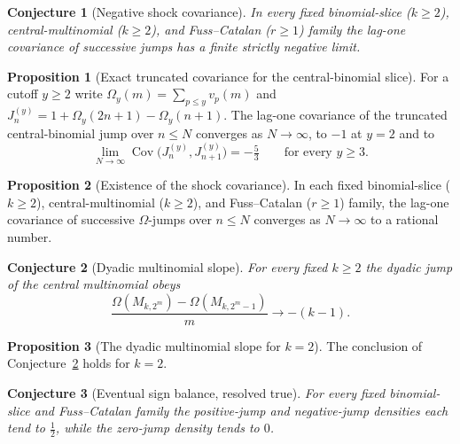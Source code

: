 \documentclass[11pt]{article}
\newtheorem{conjecture}{Conjecture}
\theoremstyle{definition}
\newtheorem{proposition}{Proposition}
\begin{document}
\begin{conjecture}[Negative shock covariance]\label{w17}
In every fixed binomial-slice ($k\ge2$), central-multinomial ($k\ge2$), and Fuss--Catalan ($r\ge1$) family the lag-one covariance of successive jumps has a finite strictly negative limit.
\end{conjecture}

\begin{proposition}[Exact truncated covariance for the central-binomial slice]\label{w:cov53}
For a cutoff $y\ge2$ write $\Omega_y(m)=\sum_{p\le y}v_p(m)$ and $J^{(y)}_n=1+\Omega_y(2n+1)-\Omega_y(n+1)$.  The lag-one covariance of the truncated central-binomial jump over $n\le N$ converges as $N\to\infty$, to $-1$ at $y=2$ and to
\[
\lim_{N\to\infty}\operatorname{Cov}\bigl(J^{(y)}_n,J^{(y)}_{n+1}\bigr)=-\tfrac53\qquad\text{for every }y\ge3.
\]
\end{proposition}

\begin{proposition}[Existence of the shock covariance]\label{w:covexist}
In each fixed binomial-slice ($k\ge2$), central-multinomial ($k\ge2$), and Fuss--Catalan ($r\ge1$) family, the lag-one covariance of successive $\Omega$-jumps over $n\le N$ converges as $N\to\infty$ to a rational number.
\end{proposition}

\begin{conjecture}[Dyadic multinomial slope]\label{w18}
For every fixed $k\ge2$ the dyadic jump of the central multinomial obeys
\[
\frac{\Omega(M_{k,2^m})-\Omega(M_{k,2^m-1})}{m}\longrightarrow-(k-1).
\]
\end{conjecture}

\begin{proposition}[The dyadic multinomial slope for $k=2$]\label{w:k2slope}
The conclusion of Conjecture~\ref{w18} holds for $k=2$.
\end{proposition}

\begin{conjecture}[Eventual sign balance, resolved true]\label{w19}
For every fixed binomial-slice and Fuss--Catalan family the positive-jump and negative-jump densities each tend to $\tfrac12$, while the zero-jump density tends to $0$.
\end{conjecture}
\end{document}
